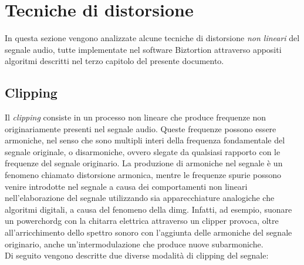 \section{Tecniche di distorsione}

In questa sezione vengono analizzate alcune tecniche di distorsione \textit{non lineari} del segnale audio, tutte implementate nel software Biztortion attraverso appositi algoritmi descritti nel terzo capitolo del presente documento.

\subsection{Clipping}
Il \textit{clipping} consiste in un processo non lineare che produce frequenze non originariamente presenti nel segnale audio. Queste frequenze possono essere armoniche, nel senso che sono multipli interi della frequenza fondamentale del segnale originale, o disarmoniche, ovvero slegate da qualsiasi rapporto con le frequenze del segnale originario. La produzione di armoniche nel segnale è un fenomeno chiamato distorsione armonica, mentre le frequenze spurie possono venire introdotte nel segnale a causa dei comportamenti non lineari nell'elaborazione del segnale utilizzando sia apparecchiature analogiche che algoritmi digitali, a causa del fenomeno della \gls{dimg}. Infatti, ad esempio, suonare un \gls{powerchordg} con la chitarra elettrica attraverso un clipper provoca, oltre all'arricchimento dello spettro sonoro con l'aggiunta delle armoniche del segnale originario, anche un'intermodulazione che produce nuove subarmoniche. \\
Di seguito vengono descritte due diverse modalità di clipping del segnale:
